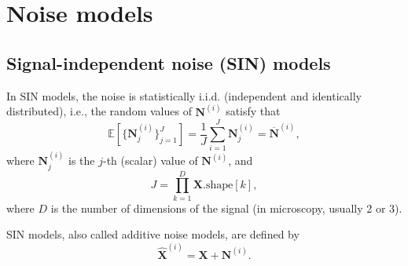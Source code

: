 \documentclass{article}
\begin{document}
\section{Noise models}
\label{sec:noise_models}

\subsection{Signal-independent noise (SIN) models}
In SIN models, the noise is statistically i.i.d. (independent and
identically distributed), i.e., the random values of ${\mathbf N}^{(i)}$ satisfy that
\begin{equation}
  {\mathbb E}[\{{\mathbf N}^{(i)}_j\}_{j=1}^J]=\frac{1}{J} \sum_{i=1}^J {\mathbf N}_j^{(i)}=\overline{\mathbf N}^{(i)},
  \label{eq:noise_expectation_1}
\end{equation}
where ${\mathbf N}^{(i)}_j$ is the $j$-th (scalar) value
of ${\mathbf N}^{(i)}$, and
\begin{equation}
  J=\prod_{k=1}^D \mathbf{X}.\text{shape}[k],
\end{equation}
where $D$ is the number of dimensions of the signal (in microscopy, usually 2 or 3).

SIN models, also called additive noise models, are defined by
\begin{equation}
  \hat{\mathbf X}^{(i)} = {\mathbf X} + {\mathbf N}^{(i)}.
  \label{eq:additive_noisy_model}
\end{equation}
\end{document}
